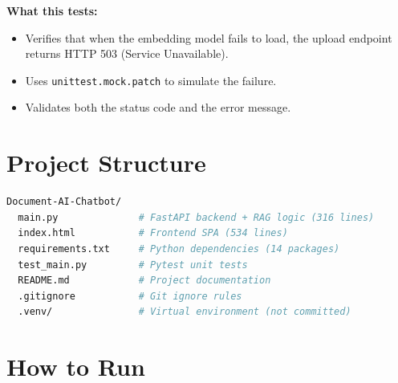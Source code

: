 \documentclass[12pt,a4paper]{article}
\begin{document}
\textbf{What this tests:}
\begin{itemize}
  \item Verifies that when the embedding model fails to load, the upload endpoint returns HTTP 503 (Service Unavailable).
  \item Uses \texttt{unittest.mock.patch} to simulate the failure.
  \item Validates both the status code and the error message.
\end{itemize}

\section{Project Structure}

\begin{lstlisting}[language=bash, caption={Directory structure}]
Document-AI-Chatbot/
  main.py              # FastAPI backend + RAG logic (316 lines)
  index.html           # Frontend SPA (534 lines)
  requirements.txt     # Python dependencies (14 packages)
  test_main.py         # Pytest unit tests
  README.md            # Project documentation
  .gitignore           # Git ignore rules
  .venv/               # Virtual environment (not committed)
\end{lstlisting}

\section{How to Run}
\end{document}
